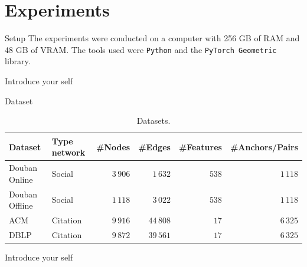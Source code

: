 \documentclass[aspectratio=169]{beamer}
\begin{document}
\section{Experiments}
    \begin{frame}{Setup}
        The experiments were conducted on a computer with 256 GB of RAM and 48 GB of VRAM. The tools used were \texttt{Python} and the \texttt{PyTorch Geometric} library.

        \begin{note}
            {Introduce your self}
        \end{note}
    \end{frame}

    \begin{frame}{Dataset}
        \begin{table}[htp!]
            \centering
            \caption{Datasets.}
            \begin{tabular}{@{}llrrrr@{}}
                \toprule
                Dataset & Type network & \#Nodes  & \#Edges & \#Features & \#Anchors/Pairs \\
                \midrule
                Douban Online & Social    & $3\,906$ & $1\,632$ & $538$ & $1\,118$  \\
                Douban Offline & Social    & $1\,118$   & $3\,022$  & $538$ & $1\,118$ \\\midrule
                ACM & Citation  & $9\,916$ & $44\,808$ & $17$ & $6\,325$  \\
                DBLP & Citation  & $9\,872$ & $39\,561$  & $17$ & $6\,325$  \\\bottomrule 
            \end{tabular}
        \end{table}

        \begin{note}
            {Introduce your self}
        \end{note}
    \end{frame}
\end{document}
